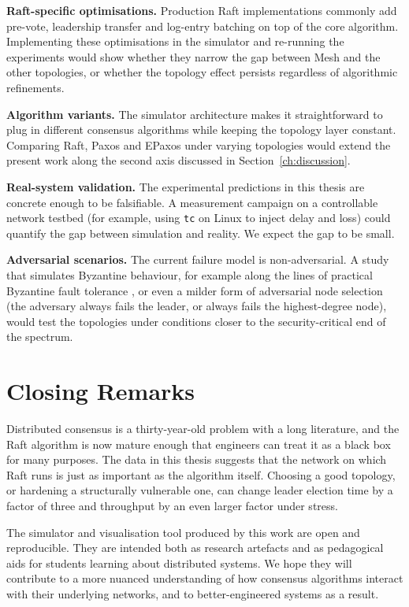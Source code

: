 \textbf{Raft-specific optimisations.} Production Raft implementations commonly add pre-vote, leadership transfer and log-entry batching on top of the core algorithm. Implementing these optimisations in the simulator and re-running the experiments would show whether they narrow the gap between Mesh and the other topologies, or whether the topology effect persists regardless of algorithmic refinements.

\textbf{Algorithm variants.} The simulator architecture makes it straightforward to plug in different consensus algorithms while keeping the topology layer constant. Comparing Raft, Paxos and EPaxos under varying topologies would extend the present work along the second axis discussed in Section~\ref{ch:discussion}.

\textbf{Real-system validation.} The experimental predictions in this thesis are concrete enough to be falsifiable. A measurement campaign on a controllable network testbed (for example, using \texttt{tc} on Linux to inject delay and loss) could quantify the gap between simulation and reality. We expect the gap to be small.

\textbf{Adversarial scenarios.} The current failure model is non-adversarial. A study that simulates Byzantine behaviour, for example along the lines of practical Byzantine fault tolerance \citep{castro1999}, or even a milder form of adversarial node selection (the adversary always fails the leader, or always fails the highest-degree node), would test the topologies under conditions closer to the security-critical end of the spectrum.

\section{Closing Remarks}

Distributed consensus is a thirty-year-old problem with a long literature, and the Raft algorithm is now mature enough that engineers can treat it as a black box for many purposes. The data in this thesis suggests that the network on which Raft runs is just as important as the algorithm itself. Choosing a good topology, or hardening a structurally vulnerable one, can change leader election time by a factor of three and throughput by an even larger factor under stress.

The simulator and visualisation tool produced by this work are open and reproducible. They are intended both as research artefacts and as pedagogical aids for students learning about distributed systems. We hope they will contribute to a more nuanced understanding of how consensus algorithms interact with their underlying networks, and to better-engineered systems as a result.

